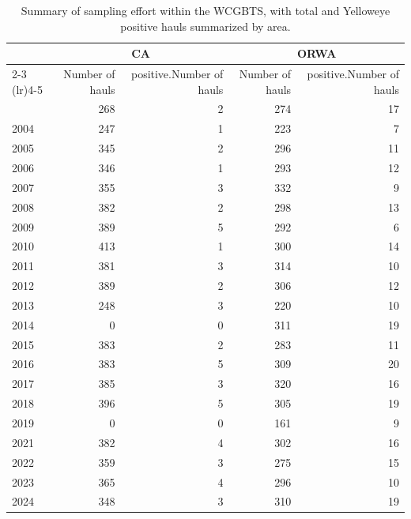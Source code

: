 \documentclass[
  english,
]{article}
\begin{document}
\begin{longtable}{l|rrrr}

\caption{\label{tbl-sampling-effort-nwfsc}Summary of sampling effort
within the WCGBTS, with total and Yelloweye positive hauls summarized by
area.}

\tabularnewline

\toprule
 & \multicolumn{2}{c}{CA} & \multicolumn{2}{c}{ORWA} \\ 
\cmidrule(lr){2-3} \cmidrule(lr){4-5}
 & Number of hauls & positive.Number of hauls & Number of hauls & positive.Number of hauls \\ 
\midrule\addlinespace[2.5pt]
2003 & 268 & 2 & 274 & 17 \\ 
2004 & 247 & 1 & 223 & 7 \\ 
2005 & 345 & 2 & 296 & 11 \\ 
2006 & 346 & 1 & 293 & 12 \\ 
2007 & 355 & 3 & 332 & 9 \\ 
2008 & 382 & 2 & 298 & 13 \\ 
2009 & 389 & 5 & 292 & 6 \\ 
2010 & 413 & 1 & 300 & 14 \\ 
2011 & 381 & 3 & 314 & 10 \\ 
2012 & 389 & 2 & 306 & 12 \\ 
2013 & 248 & 3 & 220 & 10 \\ 
2014 & 0 & 0 & 311 & 19 \\ 
2015 & 383 & 2 & 283 & 11 \\ 
2016 & 383 & 5 & 309 & 20 \\ 
2017 & 385 & 3 & 320 & 16 \\ 
2018 & 396 & 5 & 305 & 19 \\ 
2019 & 0 & 0 & 161 & 9 \\ 
2021 & 382 & 4 & 302 & 16 \\ 
2022 & 359 & 3 & 275 & 15 \\ 
2023 & 365 & 4 & 296 & 10 \\ 
2024 & 348 & 3 & 310 & 19 \\ 
\bottomrule

\end{longtable}

\endgroup

\begingroup
\fontsize{9.0pt}{11.0pt}\selectfont
\end{document}
